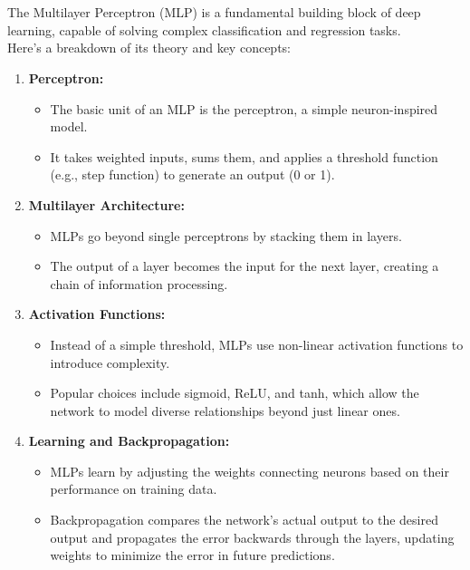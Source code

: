 \documentclass{article}
\begin{document}
   \section{}
    \begin{flushleft}
        \noindent
        \large{
        The Multilayer Perceptron (MLP) is a fundamental building block of deep learning, capable of solving complex classification and regression tasks. \\ 
        \noindent  Here's a breakdown of its theory and key concepts:}



        \begin{enumerate}
            \item \textbf{Perceptron:}
                \begin{itemize}
                    \item The basic unit of an MLP is the perceptron, a simple neuron-inspired model.
                    \item It takes weighted inputs, sums them, and applies a threshold function (e.g., step function) to generate an output (0 or 1).
                \end{itemize}
            \item \textbf{Multilayer Architecture:}
                \begin{itemize}
                    \item MLPs go beyond single perceptrons by stacking them in layers.
                    \item The output of a layer becomes the input for the next layer, creating a chain of information processing.
                \end{itemize}

            \item \textbf{Activation Functions:}
                \begin{itemize}
                    \item Instead of a simple threshold, MLPs use non-linear activation functions to introduce complexity.
                    \item Popular choices include sigmoid, ReLU, and tanh, which allow the network to model diverse relationships beyond just linear ones.
                \end{itemize}

            \item \textbf{Learning and Backpropagation:}
                \begin{itemize}
                    \item MLPs learn by adjusting the weights connecting neurons based on their performance on training data.
                    \item Backpropagation compares the network's actual output to the desired output and propagates the error backwards through the layers, updating weights to minimize the error in future predictions.
                \end{itemize}


\end{enumerate}
\end{flushleft}
\end{document}
